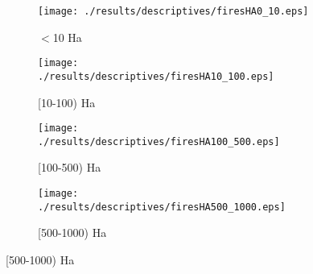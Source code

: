 \documentclass[11pt]{article}
\begin{document}
\begin{spacing}{1.3}




%   
    
    
\begin{figure}[htpb!]
    \centering
    \caption{Wildfire Exposures by Magnitude of Fire}
    \label{fig:descfires}
    \begin{subfigure}{0.45\textwidth}
          \texttt{[image: ./results/descriptives/firesHA0\_10.eps]}
         \caption{$<$10 Ha}
    \end{subfigure}
    \begin{subfigure}{0.45\textwidth}
          \texttt{[image: ./results/descriptives/firesHA10\_100.eps]}
         \caption{[10-100) Ha}
    \end{subfigure}

    \begin{subfigure}{0.45\textwidth}
          \texttt{[image: ./results/descriptives/firesHA100\_500.eps]}
         \caption{[100-500) Ha}
    \end{subfigure}
    \begin{subfigure}{0.45\textwidth}
          \texttt{[image: ./results/descriptives/firesHA500\_1000.eps]}
         \caption{[500-1000) Ha}
    \end{subfigure}
\end{figure}


\end{spacing}
\end{document}
